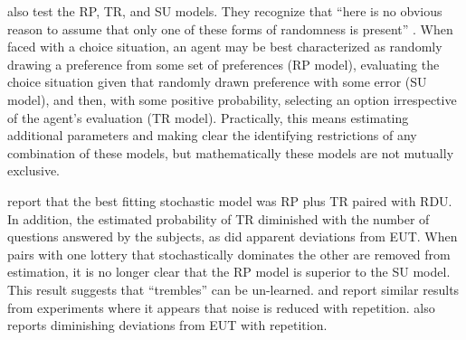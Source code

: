 \documentclass[../main.tex]{subfiles}
\begin{document}
\textcite{Loomes2002} also test the RP, TR, and SU models.
They recognize that \enquote{here is no obvious reason to assume that only one of these forms of randomness is present} \parencite*[106]{Loomes2002}.{\footnotemark}
When faced with a choice situation, an agent may be best characterized as randomly drawing a preference from some set of preferences (RP model), evaluating the choice situation given that randomly drawn preference with some error (SU model), and then, with some positive probability, selecting an option irrespective of the agent's evaluation (TR model).
Practically, this means estimating additional parameters and making clear the identifying restrictions of any combination of these models, but mathematically these models are not mutually exclusive.{\footnotemark}

\addtocounter{footnote}{-2}

\textcite{Loomes2002} report that the best fitting stochastic model was RP plus TR paired with RDU.
In addition, the estimated probability of TR diminished with the number of questions answered by the subjects, as did apparent deviations from EUT.
When pairs with one lottery that stochastically dominates the other are removed from estimation, it is no longer clear that the RP model is superior to the SU model.
This result suggests that \enquote{trembles} can be un-learned.
\textcite{Hey2001} and \textcite{Moffatt2002} report similar results from experiments where it appears that noise is reduced with repetition.
\textcite{Hey2001} also reports diminishing deviations from EUT with repetition.
\end{document}
